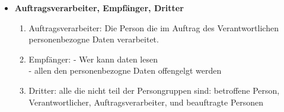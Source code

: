 \documentclass[12pt,a4paper]{article}
\begin{document}
\begin{itemize}
        \item \textbf{Auftragsverarbeiter, Empfänger, Dritter}
            \begin{enumerate}
                \item Auftragsverarbeiter:
                    Die Person die im Auftrag des Verantwortlichen personenbezogne Daten verarbeitet.
                \item Empfänger:
                    - Wer kann daten lesen \\
                    - allen den personenbezogne Daten offengelgt werden
                \item Dritter:
                    alle die nicht teil der Persongruppen sind: betroffene Person, Verantwortlicher, Auftragsverarbeiter, und
                    beauftragte Personen
            \end{enumerate}
    \end{itemize}
\end{document}
